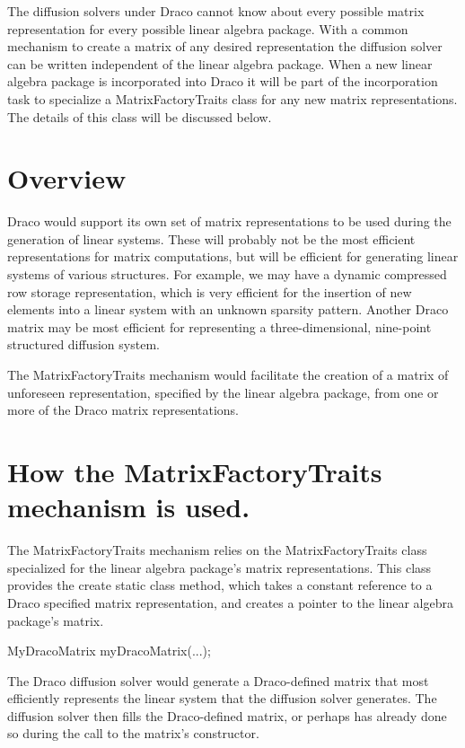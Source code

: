 \documentclass[11pt]{nmemo}
\newcommand{\cxxcode}{\color{codecolor}}
\newcommand{\code}[1]{\textcolor{codecolor}{#1}}
\begin{document}
The diffusion solvers under Draco cannot know about every possible matrix
representation for every possible linear algebra package.
With a common mechanism to create a matrix of any desired representation
the diffusion solver can be written independent of the linear algebra
package.
When a new linear algebra package is incorporated into Draco it will be part
of the incorporation task to specialize a \code{MatrixFactoryTraits} class
for any new matrix representations.
The details of this class will be discussed below.

\section{Overview}

Draco would support its own set of matrix representations to be used during
the generation of linear systems.
These will probably not be the most efficient representations for matrix
computations, but will be efficient for generating linear systems of various
structures.
For example, we may have a dynamic compressed row storage representation,
which is very efficient for the insertion of new elements into a linear
system with an unknown sparsity pattern.
Another Draco matrix may be most efficient for representing a three-dimensional,
nine-point structured diffusion system.

The \code{MatrixFactoryTraits} mechanism would facilitate the creation
of a matrix of unforeseen representation, specified by the linear algebra
package, from one or more of the Draco matrix
representations.

\section{How the \code{MatrixFactoryTraits} mechanism is used.}

The \code{MatrixFactoryTraits} mechanism relies on the
\code{MatrixFactoryTraits} class specialized for the linear algebra
package's matrix representations.
This class provides the \code{create} static class method, which takes
a constant reference to a Draco specified matrix representation, and creates
a pointer to the linear algebra package's matrix.

\begin{ttfamily}
\cxxcode
  MyDracoMatrix myDracoMatrix(...);
\end{ttfamily}

The Draco diffusion solver would generate a Draco-defined matrix that most
efficiently represents the linear system that the diffusion solver generates.
The diffusion solver then fills the Draco-defined matrix, or perhaps has already
done so during the call to the matrix's constructor.
\end{document}
